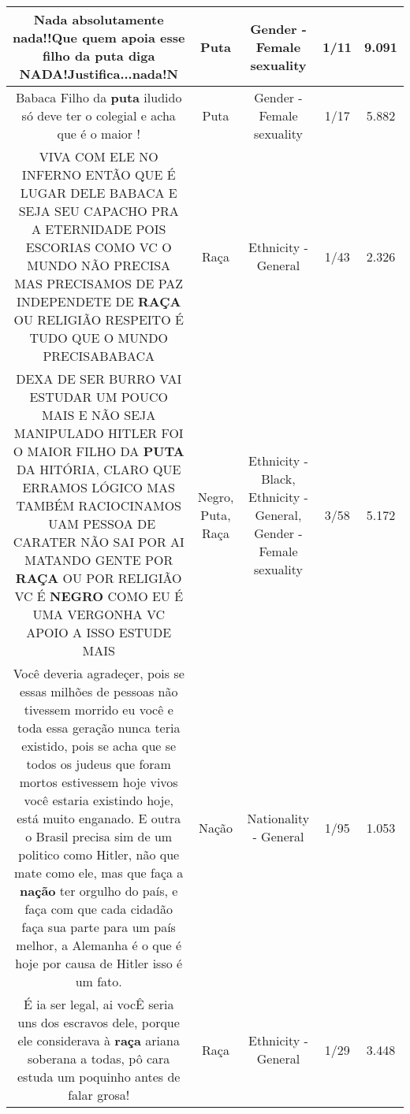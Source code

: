 \documentclass[11pt]{article}
\newlength\mylength
\begin{document}
\begin{center}
\begin{longtable}{|C{.65\mylength}|C{.30\mylength}|C{.12\mylength}|C{.12\mylength}|C{.12\mylength}|}
  \small Nada absolutamente nada!!Que quem apoia esse filho da \textbf{puta} diga NADA!Justifica...nada!N\normalsize   & Puta & Gender - Female sexuality & 1/11 & 9.091 \\  \hline
  \small Babaca Filho da \textbf{puta} iludido só deve ter o colegial e acha que é o maior !\normalsize   & Puta & Gender - Female sexuality & 1/17 & 5.882 \\  \hline
  \small VIVA COM ELE NO INFERNO ENTÃO QUE É LUGAR DELE BABACA E SEJA SEU CAPACHO PRA A ETERNIDADE POIS ESCORIAS COMO VC O MUNDO NÃO PRECISA MAS PRECISAMOS DE PAZ INDEPENDETE DE \textbf{RAÇA} OU RELIGIÃO RESPEITO É TUDO QUE O MUNDO PRECISABABACA\normalsize   & Raça & Ethnicity - General & 1/43 & 2.326 \\  \hline
  \small DEXA DE SER BURRO VAI ESTUDAR UM POUCO MAIS E NÃO SEJA MANIPULADO HITLER FOI O MAIOR FILHO DA \textbf{PUTA} DA HITÓRIA, CLARO QUE ERRAMOS LÓGICO MAS TAMBÉM RACIOCINAMOS ~UAM PESSOA DE CARATER NÃO SAI POR AI MATANDO GENTE POR \textbf{RAÇA} OU POR RELIGIÃO VC É \textbf{NEGRO} COMO EU É UMA VERGONHA VC APOIO A ISSO ESTUDE MAIS\normalsize   & Negro, Puta, Raça & Ethnicity - Black, Ethnicity - General, Gender - Female sexuality & 3/58 & 5.172 \\  \hline
  \small Você deveria agradeçer, pois se essas milhões de pessoas não tivessem morrido eu você e toda essa geração nunca teria existido, pois se acha que se todos os judeus que foram mortos estivessem hoje vivos você estaria existindo hoje, está muito enganado. E outra o Brasil precisa sim de um politico como Hitler, não que mate como ele, mas que faça a \textbf{nação} ter orgulho do país, e faça com que cada cidadão faça sua parte para um país melhor, a Alemanha é o que é hoje por causa de Hitler isso é um fato.\normalsize   & Nação & Nationality - General & 1/95 & 1.053 \\  \hline
  \small É ia ser legal, ai vocÊ seria uns dos escravos dele, porque ele considerava à \textbf{raça} ariana soberana a todas, pô cara estuda um poquinho antes de falar grosa!\normalsize   & Raça & Ethnicity - General & 1/29 & 3.448 \\  \hline

\end{longtable}
\end{center}
\end{document}
